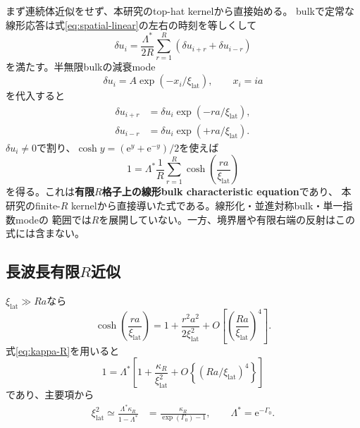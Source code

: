 \documentclass[a4paper,12pt]{ltjsarticle}
\newcommand{\e}{\mathrm e}
\begin{document}
まず連続体近似をせず、本研究のtop-hat kernelから直接始める。
bulkで定常な線形応答は式\eqref{eq:spatial-linear}の左右の時刻を等しくして
\begin{equation}
 \delta u_i
 =\frac{\Lambda^*}{2R}\sum_{r=1}^{R}
 \left(\delta u_{i+r}+\delta u_{i-r}\right)
 \label{eq:lattice-stationary}
\end{equation}
を満たす。半無限bulkの減衰mode
\begin{equation}
 \delta u_i=A\exp(-x_i/\xi_{\mathrm{lat}}),
 \qquad x_i=ia
\end{equation}
を代入すると
\begin{align}
 \delta u_{i+r}
 &=\delta u_i\exp(-ra/\xi_{\mathrm{lat}}),\\
 \delta u_{i-r}
 &=\delta u_i\exp(+ra/\xi_{\mathrm{lat}}).
\end{align}
$\delta u_i\neq0$で割り、$\cosh y=(\e^y+\e^{-y})/2$を使えば
\begin{equation}
 \boxed{
  1=\Lambda^*\frac1R\sum_{r=1}^{R}
  \cosh\!\left(\frac{ra}{\xi_{\mathrm{lat}}}\right)}
 \label{eq:finite-R-characteristic}
\end{equation}
を得る。これは\textbf{有限$R$格子上の線形bulk characteristic equation}であり、
本研究のfinite-$R$ kernelから直接導いた式である。線形化・並進対称bulk・単一指数modeの
範囲では$R$を展開していない。一方、境界層や有限右端の反射はこの式には含まない。

\subsection{長波長有限\texorpdfstring{$R$}{R}近似}

$\xi_{\mathrm{lat}}\gg Ra$なら
\begin{equation}
 \cosh\!\left(\frac{ra}{\xi_{\mathrm{lat}}}\right)
 =1+\frac{r^2a^2}{2\xi_{\mathrm{lat}}^2}
 +O\!\left[\left(\frac{Ra}{\xi_{\mathrm{lat}}}\right)^4\right].
\end{equation}
式\eqref{eq:kappa-R}を用いると
\begin{equation}
 1=\Lambda^*\left[1+\frac{\kappa_R}{\xi_{\mathrm{lat}}^2}
 +O\!\left\{(Ra/\xi_{\mathrm{lat}})^4\right\}\right]
\end{equation}
であり、主要項から
\begin{align}
 \boxed{\xi_{\mathrm{lat}}^2
 \simeq\frac{\Lambda^*\kappa_R}{1-\Lambda^*}}
 &=\boxed{\frac{\kappa_R}{\exp(\Gamma_0)-1}},
 \qquad \Lambda^*=\e^{-\Gamma_0}.
 \label{eq:xi-lattice-longwave}
\end{align}
\end{document}
